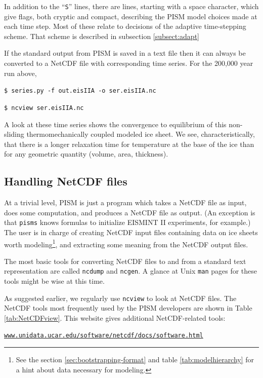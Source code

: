 \documentclass[11pt,final]{amsart}
\renewcommand{\t}[1]{\texttt{#1}}
\begin{document}
In addition to the ``\t{S}'' lines, there are lines, starting with a space character, which give flags, both cryptic and compact, describing the PISM model choices made at each time step.  Most of these relate to decisions of the adaptive time-stepping scheme.  That scheme is described in subsection \ref{subsect:adapt}

If the standard output from PISM is saved in a text file then it can always be converted to a NetCDF file with corresponding time series.  For the 200,000 year run above,

\verb|$ series.py -f out.eisIIA -o ser.eisIIA.nc|

\verb|$ ncview ser.eisIIA.nc|

A look at these time series shows the convergence to equilibrium of this non-sliding thermomechanically coupled modeled ice sheet.  We see, characteristically, that there is a longer relaxation time for temperature at the base of the ice than for any geometric quantity (volume, area, thickness).

\subsection{Handling NetCDF files}\label{subsect:nctoolsintro}  At a trivial level, PISM is just a program which takes a NetCDF file as input, does some computation, and produces a NetCDF file as output.  (An exception is that \verb|pisms| knows formulas to initialize EISMINT II experiments, for example.)  The user is in charge of creating NetCDF input files containing data on ice sheets worth modeling\footnote{See the section \ref{sec:bootstrapping-format} and table \ref{tab:modelhierarchy} for a hint about data necessary for modeling.}, and extracting some meaning from the NetCDF output files.

The most basic tools for converting NetCDF files to and from a standard text representation are called \verb|ncdump| and \verb|ncgen|.  A glance at Unix \verb|man| pages for these tools might be wise at this time.

As suggested earlier, we regularly use \verb|ncview| to look at NetCDF files.  The NetCDF tools most frequently used by the PISM developers are shown in Table \ref{tab:NetCDFview}.  This website gives additional NetCDF-related tools:

\centerline{ \href{http://www.unidata.ucar.edu/software/netcdf/docs/software.html}{\t{www.unidata.ucar.edu/software/netcdf/docs/software.html}} } 
\end{document}

